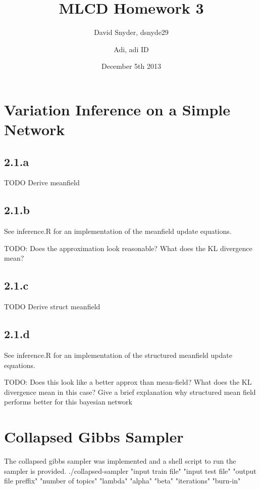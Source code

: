 \documentclass{article}
\title{MLCD Homework 3}
\date{December 5th 2013}
\author{David Snyder, dsnyde29
        \and Adi, adi ID}
\begin{document}
\maketitle

\section*{Variation Inference on a Simple Network}
\subsection*{2.1.a}
TODO Derive meanfield
\subsection*{2.1.b}
See inference.R for an implementation of the meanfield update equations.

TODO: Does the approximation look reasonable? What does the KL divergence mean?

\subsection*{2.1.c}
TODO Derive struct meanfield
\subsection*{2.1.d}
See inference.R for an implementation of the structured meanfield
update equations. 

TODO:
Does this look like a better approx than mean-field?
What does the KL divergence mean in this case?
Give a brief explanation why structured mean field performs 
better for this bayesian network

\section*{Collapsed Gibbs Sampler}
The collapsed gibbs sampler was implemented and a shell script to run the sampler is provided.
./collapsed-sampler "input train file" "input test file" "output file preffix" "number of topics" "lambda" "alpha" "beta" "iterations" "burn-in"
\end{document}

